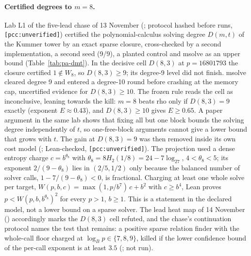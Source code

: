 \paragraph{Certified degrees to $m=8$.} Lab L1 of the five-lead chase of 13
November (; protocol
hashed before runs, \texttt{[pcc:unverified]}) certified the
polynomial-calculus solving degree $D(m,t)$ of the Kummer tower by an exact
sparse closure, cross-checked by a second implementation, a second seed
(9/9), a planted control and msolve as an upper bound
(Table~\ref{tab:pa-dmt}). In the decisive cell $D(8,3)$ at $p=16801793$ the
closure certified $1\notin W_8$, so $D(8,3)\ge9$; its degree-9 level did not
finish. msolve cleared degree 9 and entered a degree-10 round before
crashing at the memory cap, uncertified evidence for $D(8,3)\ge10$. The
frozen rule reads the cell as inconclusive, leaning towards the kill:
$m=8$ beats rho only if $D(8,3)=9$ exactly (exponent $E\approx0.43$), and
$D(8,3)\ge10$ gives $E\ge0.65$. A paper argument in the same lab shows that
fixing all but one block bounds the solving degree independently of $t$, so
one-free-block arguments cannot give a lower bound that grows with $t$.
The gain at $D(8,3)=9$ was then removed inside its own cost model
(;
Lean-checked, \texttt{[pcc:unverified]}). The projection used a dense
entropy charge $c=b^{\theta_8}$ with $\theta_8=8H_2(1/8)=24-7\log_27$,
$4<\theta_8<5$; its exponent $2/(9-\theta_8)$ lies in $(2/5,1/2)$ only
because the balanced number of solver calls, $1-7/(9-\theta_8)<0$, is
fractional. Charging at least one whole solve per target,
$W(p,b,c)=\max(1,p/b^7)\,c+b^2$ with $c\ge b^4$, Lean proves
$p<W(p,b,b^{\theta_8})^2$ for every $p>1$, $b\ge1$. This is a statement in
the declared model, not a lower bound on a sparse solver. The lead heat map
of 14 November ()
accordingly marks the $D(8,3)$ cell refuted, and the chase's continuation
protocol names the test that remains: a positive sparse relation finder with
the whole-call floor charged at $\log_Bp\in\{7,8,9\}$, killed if the lower
confidence bound of the per-call exponent is at least $3.5$
(; not
run).

